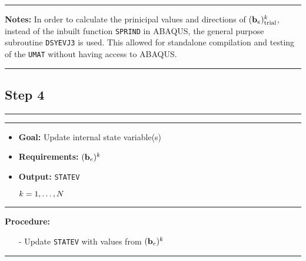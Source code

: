 \vspace{0.1cm}
\hrule
\textbf{Notes:} \newline
In order to calculate the prinicipal values and directions of \(({\mathbf{b}_{e}})_\text{trial}^{k}\), instead of the inbuilt function \texttt{SPRIND} in ABAQUS, the general purpose subroutine \texttt{DSYEVJ3} is used. This allowed for standalone compilation and testing of the \texttt{UMAT} without having access to ABAQUS.
\vspace{0.1cm}
\hrule
\vspace{0.8cm}

\subsection*{Step 4}
\vspace{0.1cm}
\hrule
\vspace{0.1cm}
\hrule
\begin{itemize}
    \item \textbf{Goal:} Update internal state variable(s)
    \item \textbf{Requirements:} \(({\mathbf{b}_{e}})^{k}\)
    \item \textbf{Output:} \texttt{STATEV}
    \item[] \(\hfill k=1,\ldots,N \)
\end{itemize}
\vspace{0.1cm}
\hrule
\textbf{Procedure:}
\begin{itemize}
    \item[-] Update \texttt{STATEV} with values from \(({\mathbf{b}_{e}})^{k}\)
\end{itemize}
\vspace{0.1cm}
\hrule
\vspace{0.8cm}

